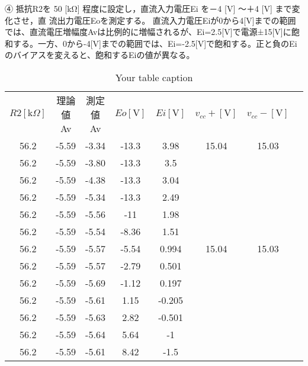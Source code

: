 \documentclass[a4paper,11pt,xelatex,ja=standard]{bxjsarticle}
\begin{document}
            ④	抵抗R2を 50 [kΩ] 程度に設定し，直流入力電圧Ei を－4 [V] ～＋4 [V] まで変化させ，直
            流出力電圧Eoを測定する。
            直流入力電圧Eiが0から4[V]までの範囲では、直流電圧増幅度Avは比例的に増幅されるが、Ei=2.5[V]で電源±15[V]に飽和する。一方、0から-4[V]までの範囲では、Ei=-2.5[V]で飽和する。正と負のEiのバイアスを変えると、飽和するEiの値が異なる。
            \begin{table}[htbp]
                \centering
                \caption{Your table caption}
                \label{tab:my-table}
                \begin{tabular}{@{}cccccccc@{}}
                  $R2[\text{k}\Omega]$ & 理論値Av & 測定値Av & $Eo[\text{V}]$ & $Ei[\text{V}]$ & $v_{cc}+[\text{V}]$ & $v_{cc}-[\text{V}]$ \\ 
                  56.2 & -5.59 & -3.34 & -13.3 & 3.98 & 15.04 & 15.03 \\
                  56.2 & -5.59 & -3.80 & -13.3 & 3.5  &                     &                     \\
                  56.2 & -5.59 & -4.38 & -13.3 & 3.04 &                     &                     \\
                  56.2 & -5.59 & -5.34 & -13.3 & 2.49 &                     &                     \\
                  56.2 & -5.59 & -5.56 & -11   & 1.98 &                     &                     \\
                  56.2 & -5.59 & -5.54 & -8.36 & 1.51 &                     &                     \\
                  56.2 & -5.59 & -5.57 & -5.54 & 0.994 & 15.04 & 15.03 \\
                  56.2 & -5.59 & -5.57 & -2.79 & 0.501 &                     &                     \\
                  56.2 & -5.59 & -5.69 & -1.12 & 0.197 &                     &                     \\
                  56.2 & -5.59 & -5.61 & 1.15  & -0.205 &                     &                     \\
                  56.2 & -5.59 & -5.63 & 2.82  & -0.501 &                     &                     \\
                  56.2 & -5.59 & -5.64 & 5.64  & -1     &                     &                     \\
                  56.2 & -5.59 & -5.61 & 8.42  & -1.5   &                     &                     \\

\end{tabular}
\end{table}
\end{document}
